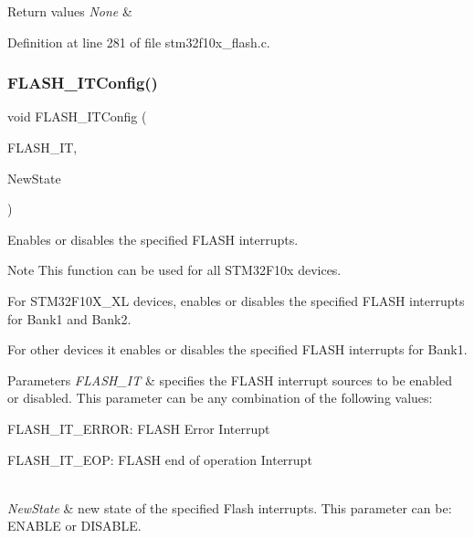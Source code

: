 \begin{DoxyRetVals}{Return values}
{\em None} & \\
\hline
\end{DoxyRetVals}


Definition at line 281 of file stm32f10x\+\_\+flash.\+c.

\mbox{\label{group___f_l_a_s_h___exported___functions_ga94c1e51a9c3bf8d48eb6eb4a4d054861}} 
\subsubsection{\texorpdfstring{F\+L\+A\+S\+H\+\_\+\+I\+T\+Config()}{FLASH\_ITConfig()}}
{\footnotesize\ttfamily void F\+L\+A\+S\+H\+\_\+\+I\+T\+Config (\begin{DoxyParamCaption}\item[{uint32\+\_\+t}]{F\+L\+A\+S\+H\+\_\+\+IT,  }\item[{\hyperlink{group___exported__types_gac9a7e9a35d2513ec15c3b537aaa4fba1}{Functional\+State}}]{New\+State }\end{DoxyParamCaption})}



Enables or disables the specified F\+L\+A\+SH interrupts. 

\begin{DoxyNote}{Note}
This function can be used for all S\+T\+M32\+F10x devices.
\begin{DoxyItemize}
\item For S\+T\+M32\+F10\+X\+\_\+\+XL devices, enables or disables the specified F\+L\+A\+SH interrupts for Bank1 and Bank2.
\item For other devices it enables or disables the specified F\+L\+A\+SH interrupts for Bank1. 
\end{DoxyItemize}
\end{DoxyNote}

\begin{DoxyParams}{Parameters}
{\em F\+L\+A\+S\+H\+\_\+\+IT} & specifies the F\+L\+A\+SH interrupt sources to be enabled or disabled. This parameter can be any combination of the following values\+: \begin{DoxyItemize}
\item F\+L\+A\+S\+H\+\_\+\+I\+T\+\_\+\+E\+R\+R\+OR\+: F\+L\+A\+SH Error Interrupt \item F\+L\+A\+S\+H\+\_\+\+I\+T\+\_\+\+E\+OP\+: F\+L\+A\+SH end of operation Interrupt \end{DoxyItemize}
\\
\hline
{\em New\+State} & new state of the specified Flash interrupts. This parameter can be\+: E\+N\+A\+B\+LE or D\+I\+S\+A\+B\+LE. \\
\hline
\end{DoxyParams}

